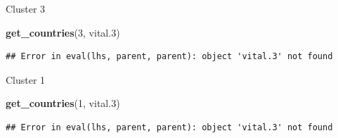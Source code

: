 \documentclass[ignorenonframetext,]{beamer}
\newenvironment{Shaded}{\begin{snugshade}}{\end{snugshade}}
\newcommand{\DecValTok}[1]{\textcolor[rgb]{0.00,0.00,0.81}{#1}}
\newcommand{\FloatTok}[1]{\textcolor[rgb]{0.00,0.00,0.81}{#1}}
\newcommand{\KeywordTok}[1]{\textcolor[rgb]{0.13,0.29,0.53}{\textbf{#1}}}
\newcommand{\NormalTok}[1]{#1}
\begin{document}
\begin{frame}[fragile]{Cluster 3}
\protect\hypertarget{cluster-3}{}

\begin{Shaded}
\begin{Highlighting}[]
\KeywordTok{get_countries}\NormalTok{(}\DecValTok{3}\NormalTok{, vital}\FloatTok{.3}\NormalTok{)}
\end{Highlighting}
\end{Shaded}

\begin{verbatim}
## Error in eval(lhs, parent, parent): object 'vital.3' not found
\end{verbatim}

\end{frame}

\begin{frame}[fragile]{Cluster 1}
\protect\hypertarget{cluster-1}{}

\begin{Shaded}
\begin{Highlighting}[]
\KeywordTok{get_countries}\NormalTok{(}\DecValTok{1}\NormalTok{, vital}\FloatTok{.3}\NormalTok{)}
\end{Highlighting}
\end{Shaded}

\begin{verbatim}
## Error in eval(lhs, parent, parent): object 'vital.3' not found
\end{verbatim}

\end{frame}
\end{document}
